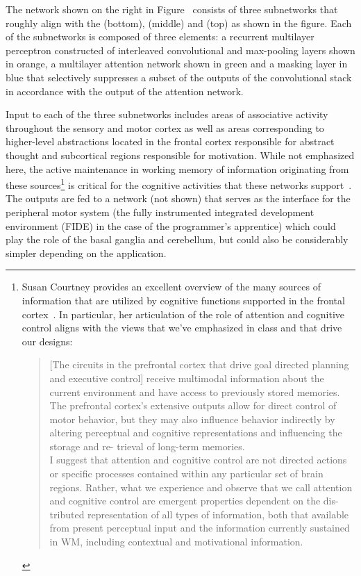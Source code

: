 
The network shown on the right in Figure~{} consists of three subnetworks that roughly align with the {} (bottom), {} (middle) and {} (top) as shown in the figure. Each of the subnetworks is composed of three elements: a recurrent multilayer perceptron constructed of interleaved convolutional and max-pooling layers shown in orange, a multilayer attention network shown in green and a masking layer in blue that selectively suppresses a subset of the outputs of the convolutional stack in accordance with the output of the attention network.

Input to each of the three subnetworks includes areas of associative activity throughout the sensory and motor cortex as well as areas corresponding to higher-level abstractions located in the frontal cortex responsible for abstract thought and subcortical regions responsible for motivation. While not emphasized here, the active maintenance in working memory of information originating from these sources\footnote{%
  Susan Courtney provides an excellent overview of the many sources of information that are utilized by cognitive functions supported in the frontal cortex~\cite{CourtneyCABN-04}. In particular, her articulation of the role of attention and cognitive control aligns with the views that we've emphasized in class and that drive our designs:
\begin{quotation}
  [The circuits in the prefrontal cortex that drive goal directed planning and executive control] receive multimodal information about the current environment and have access to previously stored memories. The prefrontal cortex's extensive outputs allow for direct control of motor behavior, but they may also influence behavior indirectly by altering perceptual and cognitive representations and influencing the storage and re- trieval of long-term memories.\\
  I suggest that attention and cognitive control are not directed actions or specific processes contained within any particular set of brain regions. Rather, what we experience and observe that we call attention and cognitive control are emergent properties dependent on the dis- tributed representation of all types of information, both that available from present perceptual input and the information currently sustained in WM, including contextual and motivational information.
%
\end{quotation}}
%
is critical for the cognitive activities that these networks support~\cite{CourtneyCABN-04,Goldman-RakicARN-88}. The outputs are fed to a network (not shown) that serves as the interface for the peripheral motor system (the fully instrumented integrated development environment (FIDE) in the case of the programmer's apprentice) which could play the role of the basal ganglia and cerebellum, but could also be considerably simpler depending on the application.

